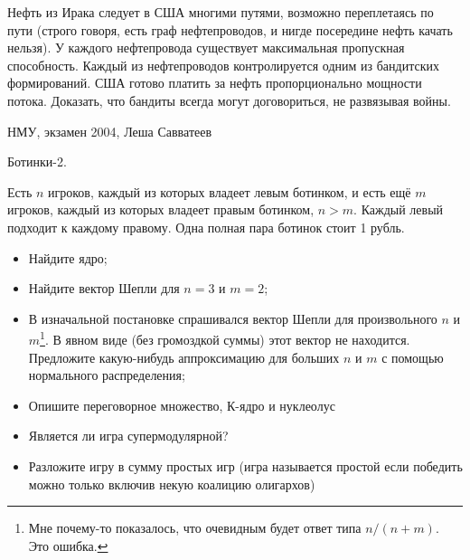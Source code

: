 \begin{problem}
 Нефть из Ирака следует в США многими путями, возможно переплетаясь по пути (строго говоря, есть граф нефтепроводов, и нигде посередине нефть качать нельзя). У каждого нефтепровода существует максимальная пропускная способность. Каждый из нефтепроводов контролируется одним из бандитских формирований. США готово платить за нефть пропорционально мощности потока. Доказать, что бандиты всегда могут договориться, не развязывая войны.



\begin{source}
НМУ, экзамен 2004, Леша Савватеев
\end{source}


\begin{sol}

\end{sol}
\end{problem}




\begin{problem}
Ботинки-2.

Есть $n$ игроков, каждый из которых владеет левым ботинком, и есть ещё $m$ игроков, каждый из которых владеет правым ботинком, $n>m$. Каждый левый подходит к каждому правому. Одна полная пара ботинок стоит 1 рубль.

\begin{itemize}
\item Найдите ядро;

\item Найдите вектор Шепли для $n=3$ и $m=2$;

\item В изначальной постановке спрашивался вектор Шепли для произвольного $n$ и $m$\footnote{Мне почему-то показалось, что очевидным будет ответ типа $n/(n+m)$. Это ошибка.}. В явном виде (без громоздкой суммы) этот вектор не находится. Предложите какую-нибудь аппроксимацию для больших $n$ и $m$ с помощью нормального распределения;

\item Опишите переговорное множество, К-ядро и нуклеолус

\item Является ли игра супермодулярной?

\item Разложите игру в сумму простых игр (игра называется простой если победить можно только включив некую коалицию олигархов)
\end{itemize}



\begin{sol}

\end{sol}
\end{problem}



